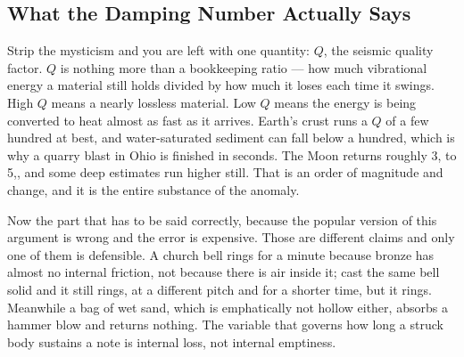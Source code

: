 
\subsection{What the Damping Number Actually Says}\label{sec:lunardamping}

Strip the mysticism and you are left with one quantity: $Q$, the seismic quality factor. $Q$ is
nothing more than a bookkeeping ratio --- how much vibrational energy a material still holds divided
by how much it loses each time it swings. High $Q$ means a nearly lossless material. Low $Q$ means
the energy is being converted to heat almost as fast as it arrives. Earth's crust runs a $Q$ of a
few hundred at best, and water-saturated sediment can fall below a hundred, which is why a quarry
blast in Ohio is finished in seconds. The Moon returns roughly 3, to 5,, and some deep
estimates run higher still. That is an order of magnitude and change, and it is the entire substance
of the anomaly.

Now the part that has to be said correctly, because the popular version of this argument is wrong
and the error is expensive.  Those are
different claims and only one of them is defensible. A church bell rings for a minute because bronze
has almost no internal friction, not because there is air inside it; cast the same bell solid and it
still rings, at a different pitch and for a shorter time, but it rings. Meanwhile a bag of wet sand,
which is emphatically not hollow either, absorbs a hammer blow and returns nothing. The variable
that governs how long a struck body sustains a note is internal loss, not internal emptiness.

